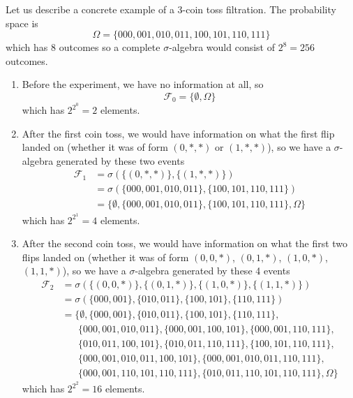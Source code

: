 \documentclass{article}
\begin{document}
      \begin{example}
        Let us describe a concrete example of a 3-coin toss filtration. The probability space is 
        \begin{equation}
          \Omega = \{000, 001, 010, 011, 100, 101, 110, 111\}
        \end{equation}
        which has $8$ outcomes so a complete $\sigma$-algebra would consist of $2^8 = 256$ outcomes. 
        \begin{enumerate}
          \item Before the experiment, we have no information at all, so 
          \begin{equation}
            \mathcal{F}_0 = \{\emptyset, \Omega\}
          \end{equation}
          which has $2^{2^0} = 2$ elements. 
          
          \item After the first coin toss, we would have information on what the first flip landed on (whether it was of form $( 0, \ast, \ast)$ or $(1, \ast, \ast)$), so we have a $\sigma$-algebra generated by these two events 
          \begin{align*}
            \mathcal{F}_1 & = \sigma(\{( 0, \ast, \ast)\}, \{(1, \ast, \ast)\}) \\
            & = \sigma(\{000, 001, 010, 011\}, \{100, 101, 110, 111\}) \\
            & = \{\emptyset, \{000, 001, 010, 011\}, \{100, 101, 110, 111\}, \Omega\}
          \end{align*}
          which has $2^{2^1} = 4$ elements. 
          
          \item After the second coin toss, we would have information on what the first two flips landed on (whether it was of form $( 0, 0, \ast)$, $( 0, 1, \ast)$, $(1, 0, \ast)$, $(1, 1, \ast)$), so we have a $\sigma$-algebra generated by these 4 events 
          \begin{align}
            \mathcal{F}_2 & = \sigma(\{( 0, 0, \ast)\}, \{( 0, 1, \ast)\}, \{(1, 0, \ast)\}, \{(1, 1, \ast)\}) \\
            & = \sigma(\{000, 001\}, \{010, 011\}, \{100, 101\}, \{110, 111\}) \\
            & = \{\emptyset, \{000, 001\}, \{010, 011\}, \{100, 101\}, \{110, 111\}, \\
            & \;\;\;\;\;\; \{000, 001, 010, 011\}, \{000, 001, 100, 101\}, \{000, 001, 110, 111\}, \\
            & \;\;\;\;\;\; \{010, 011, 100, 101\}, \{010, 011, 110, 111\}, \{100, 101, 110, 111\}, \\ 
            & \;\;\;\;\;\; \{000, 001, 010, 011, 100, 101\}, \{000, 001, 010, 011, 110, 111\}, \\
            & \;\;\;\;\;\; \{000, 001, 110, 101, 110, 111\}, \{010, 011, 110, 101, 110, 111\},  \Omega\}
          \end{align}
          which has $2^{2^2} = 16$ elements. 
          

\end{enumerate}
\end{example}
\end{document}
